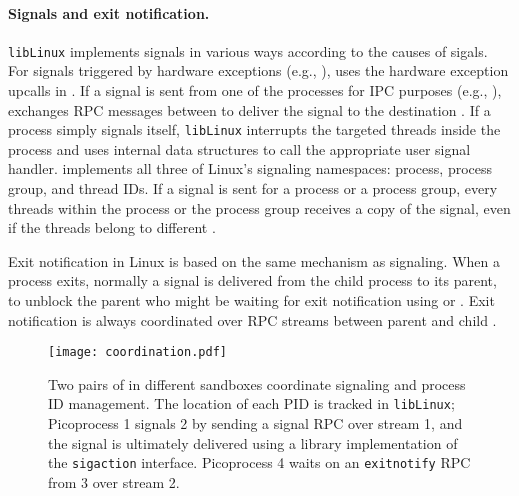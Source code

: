 \paragraph{Signals and exit notification.}
{\tt libLinux} implements signals
in various ways according to the causes of sigals.
For signals triggered by hardware exceptions (e.g., ),
\thelibos{} uses the hardware exception upcalls
in \thehostabi{}.
If a signal is sent from one of the processes for IPC purposes (e.g., ),
\thelibos{} exchanges RPC messages between \picoprocs{} to deliver the signal to the destination \picoproc{}.
If a process simply signals itself, {\tt libLinux} interrupts the targeted threads inside the process
and uses internal data structures
to call the appropriate user signal handler.
\thelibos{} implements all three of Linux's signaling namespaces:
process, process group, and thread IDs.
If a signal is sent for a process or a process group,
every threads within the process or the process group receives a copy of the signal,
even if the threads belong to different \picoprocs{}.


Exit notification in Linux is based on the same mechanism as signaling.
When a process exits, normally a  signal
is delivered from the child process to its parent,
to unblock the parent who might be waiting for exit notification using  or .
Exit notification is always coordinated over RPC streams
between parent and child \picoprocs{}.



\begin{figure}
\centering
\texttt{[image: coordination.pdf]}
\caption{Two pairs of \graphene{} \picoprocs{} in different sandboxes 
coordinate signaling and process ID management.
The location of each PID is tracked in {\tt libLinux}; Picoprocess 1 signals
\picoproc{} 2 by sending a signal RPC over stream 1,
and the signal is ultimately delivered using a 
library implementation of the {\tt sigaction} interface. Picoprocess 4 
waits on an {\tt exitnotify} RPC from  \picoproc{} 3 over stream 2. }
\label{fig:libos:coordination}
\end{figure}


